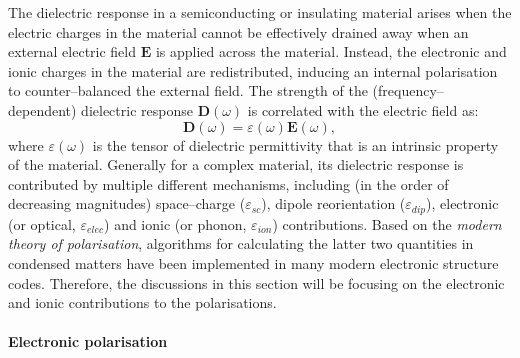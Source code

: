 The dielectric response in a semiconducting or insulating material arises when the electric charges in the material cannot be effectively drained away when an external electric field $\bm{E}$ is applied across the material. Instead, the electronic and ionic charges in the material are redistributed, inducing an internal polarisation to counter--balanced the external field. The strength of the (frequency--dependent) dielectric response $\bm{D}(\omega)$ is correlated with the electric field  as:
\begin{equation}\label{dielectric_reponse}
    \bm{D}(\omega)=\varepsilon(\omega)\bm{E}(\omega),
\end{equation}
where  $\varepsilon(\omega)$ is the tensor of dielectric permittivity that is an intrinsic property of the material. Generally for a complex material, its dielectric response is contributed by multiple different mechanisms, including (in the order of decreasing magnitudes) space--charge ($\varepsilon_{sc}$), dipole reorientation ($\varepsilon_{dip}$), electronic (or optical, $\varepsilon_{elec}$) and ionic (or phonon, $\varepsilon_{ion}$) contributions. Based on the \emph{modern theory of polarisation},\cite{spaldin2012beginner} algorithms for calculating the latter two quantities in condensed matters have been implemented in many modern electronic structure codes. Therefore, the discussions in this section will be focusing on the electronic and ionic contributions to the polarisations.

\paragraph{\textbf{Electronic polarisation}}

